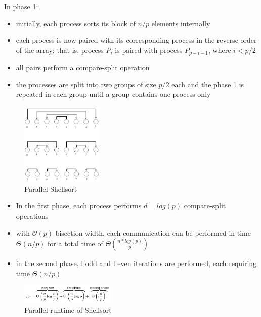 In phase 1:

\begin{itemize}
\tightlist
\item
  initially, each process sorts its block of $n/p$ elements internally
\item
  each process is now paired with its corresponding process in the
  reverse order of the array: that is, process $P_i$ is paired with
  process $P_{p-i-1}$, where $i < p/2$
\item
  all pairs perform a compare-split operation
\item
  the processes are split into two groups of size $p/2$ each and the phase
  1 is repeated in each group until a group contains one process only
\end{itemize}

\begin{figure}[H]
\centering
\includegraphics[width=0.35\textwidth]{figures/parallelshellsort.png}
\caption{Parallel Shellsort}
\end{figure}

\begin{itemize}
\tightlist
\item
  In the first phase, each process performs $d = log(p)$ compare-split
  operations
\item
  with $\mathcal{O}(p)$ bisection width, each communication can be performed in time   $\Theta(n/p)$ for a total time of $\Theta ( \frac{n * log (p)}{p})$
\item
  in the second phase, l odd and l even iterations are performed, each
  requiring time $\Theta(n/p)$
\end{itemize}

\begin{figure}[H]
\centering
\includegraphics[width=0.4\textwidth]{figures/runtimeShellsort.png}
\caption{Parallel runtime of Shellsort}
\end{figure}

